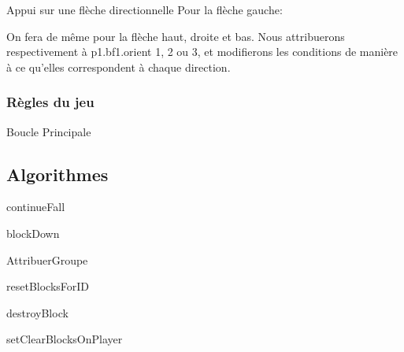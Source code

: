 \documentclass[10pt,dvipsnames,final]{beamer}
\begin{document}
\begin{frame}{Appui sur une flèche directionnelle}
Pour la flèche gauche:

On fera de même pour la flèche haut, droite et bas. Nous attribuerons respectivement à p1.bf1.orient 1, 2 ou 3, et modifierons les conditions de manière à ce qu'elles correspondent à chaque direction.
\end{frame}

\subsubsection{Règles du jeu}

\begin{frame}[allowframebreaks]{Boucle Principale}

\end{frame}

\subsection{Algorithmes}

\begin{frame}{continueFall}

\end{frame}

\begin{frame}{blockDown}

\end{frame}

\begin{frame}{AttribuerGroupe}


\end{frame}

\begin{frame}

\end{frame}

\begin{frame}{resetBlocksForID}

\end{frame}

\begin{frame}{destroyBlock}

\end{frame}

\begin{frame}{setClearBlocksOnPlayer}

\end{frame}
\end{document}
